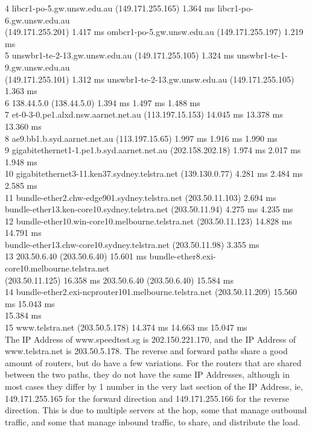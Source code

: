 \documentclass[a4paper,11pt]{article}
\begin{document}
\begin{enumerate}[leftmargin=*]
\begin{enumerate}
{			 4  libcr1-po-5.gw.unsw.edu.au (149.171.255.165)  1.364 ms libcr1-po-6.gw.unsw.edu.au\\
			 (149.171.255.201)  1.417 ms ombcr1-po-5.gw.unsw.edu.au (149.171.255.197)  1.219 ms\\
			 5  unswbr1-te-2-13.gw.unsw.edu.au (149.171.255.105)  1.324 ms unswbr1-te-1-9.gw.unsw.edu.au\\
			 (149.171.255.101)  1.312 ms unswbr1-te-2-13.gw.unsw.edu.au (149.171.255.105)  1.363 ms\\
			 6  138.44.5.0 (138.44.5.0)  1.394 ms  1.497 ms  1.488 ms\\
			 7  et-0-3-0.pe1.alxd.nsw.aarnet.net.au (113.197.15.153)  14.045 ms  13.378 ms  13.360 ms\\
			 8  ae9.bb1.b.syd.aarnet.net.au (113.197.15.65)  1.997 ms  1.916 ms  1.990 ms\\
			 9  gigabitethernet1-1.pe1.b.syd.aarnet.net.au (202.158.202.18)  1.974 ms  2.017 ms  1.948 ms\\
			10  gigabitethernet3-11.ken37.sydney.telstra.net (139.130.0.77)  4.281 ms  2.484 ms  2.585 ms\\
			11  bundle-ether2.chw-edge901.sydney.telstra.net (203.50.11.103)  2.694 ms\\
			bundle-ether13.ken-core10.sydney.telstra.net (203.50.11.94)  4.275 ms  4.235 ms\\
			12  bundle-ether10.win-core10.melbourne.telstra.net (203.50.11.123)  14.828 ms  14.791 ms\\
			bundle-ether13.chw-core10.sydney.telstra.net (203.50.11.98)  3.355 ms\\
			13  203.50.6.40 (203.50.6.40)  15.601 ms bundle-ether8.exi-core10.melbourne.telstra.net\\
			(203.50.11.125)  16.358 ms 203.50.6.40 (203.50.6.40)  15.584 ms\\
			14  bundle-ether2.exi-ncprouter101.melbourne.telstra.net (203.50.11.209)  15.560 ms  15.043 ms\\
			15.384 ms\\
			15  www.telstra.net (203.50.5.178)  14.374 ms  14.663 ms  15.047 ms\\}
			\break
			The IP Address of www.speedtest.sg is 202.150.221.170, and the IP Address of www.telstra.net is 203.50.5.178. The reverse and forward paths share a good amount of routers, but do have a few variations. For the routers that are shared between the two paths, they do not have the same IP Addresses, although in most cases they differ by 1 number in the very last section of the IP Address, ie, 149.171.255.165 for the forward direction and 149.171.255.166 for the reverse direction. This is due to multiple servers at the hop, some that manage outbound traffic, and some that manage inbound traffic, to share, and distribute the load.\\
		\end{enumerate}
\end{enumerate}
\end{document}
